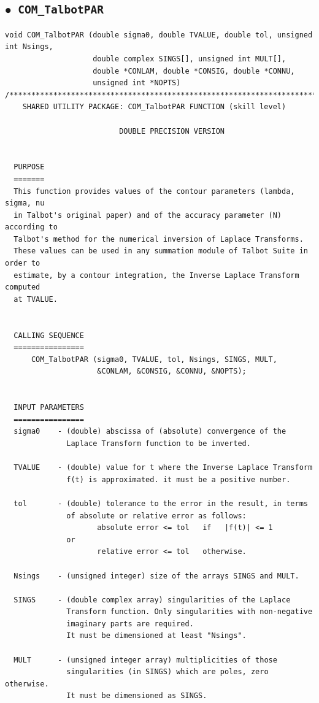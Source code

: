 \documentclass[a4paper,10pt]{report}%
\begin{document}
\subsection{\texorpdfstring{$\boldsymbol{\bullet}$}{ - }{\tt\ COM\_TalbotPAR}}
\begin{lstlisting}
void COM_TalbotPAR (double sigma0, double TVALUE, double tol, unsigned int Nsings,
                    double complex SINGS[], unsigned int MULT[],
                    double *CONLAM, double *CONSIG, double *CONNU,
                    unsigned int *NOPTS)
/*****************************************************************************
	SHARED UTILITY PACKAGE: COM_TalbotPAR FUNCTION (skill level)

                          DOUBLE PRECISION VERSION


  PURPOSE
  =======
  This function provides values of the contour parameters (lambda, sigma, nu
  in Talbot's original paper) and of the accuracy parameter (N) according to
  Talbot's method for the numerical inversion of Laplace Transforms.
  These values can be used in any summation module of Talbot Suite in order to
  estimate, by a contour integration, the Inverse Laplace Transform computed
  at TVALUE.


  CALLING SEQUENCE
  ================
      COM_TalbotPAR (sigma0, TVALUE, tol, Nsings, SINGS, MULT,
                     &CONLAM, &CONSIG, &CONNU, &NOPTS);


  INPUT PARAMETERS
  ================
  sigma0    - (double) abscissa of (absolute) convergence of the
              Laplace Transform function to be inverted.

  TVALUE    - (double) value for t where the Inverse Laplace Transform
              f(t) is approximated. it must be a positive number.

  tol       - (double) tolerance to the error in the result, in terms
              of absolute or relative error as follows:
                     absolute error <= tol   if   |f(t)| <= 1
              or
                     relative error <= tol   otherwise.

  Nsings    - (unsigned integer) size of the arrays SINGS and MULT.

  SINGS     - (double complex array) singularities of the Laplace
              Transform function. Only singularities with non-negative
              imaginary parts are required.
              It must be dimensioned at least "Nsings".

  MULT      - (unsigned integer array) multiplicities of those
              singularities (in SINGS) which are poles, zero otherwise.
              It must be dimensioned as SINGS.



\end{lstlisting}
\end{document}
